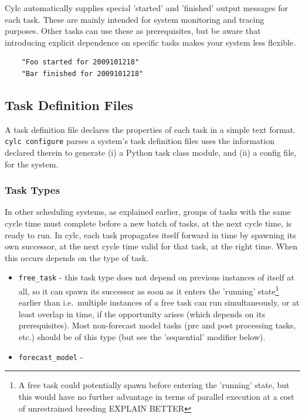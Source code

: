 \documentclass[11pt,a4paper]{article}
\begin{document}
Cylc automatically supplies special 'started' and 'finished' output
messages for each task. These are mainly intended for system monitoring
and tracing purposes. Other tasks can use these as prerequisites, but be
aware that introducing explicit dependence on specific tasks makes your
system less flexible.

\begin{lstlisting}
    "Foo started for 2009101218"
    "Bar finished for 2009101218"
\end{lstlisting}


\pagebreak
\label{sec:taskdef}
\subsection{Task Definition Files}

A task definition file declares the properties of each task in a simple
text format.  \lstinline=cylc configure= parses a system's task definition
files uses the information declared therein to generate (i) a Python
task class module, and (ii) a config file, for the system.

\label{sec:tasktype}
\subsubsection{Task Types}

In other scheduling systems, as explained earlier, groups of tasks with
the same cycle time must complete before a new batch of tasks, at the
next cycle time, is ready to run. In cylc, each task propagates itself
forward in time by spawning its own successor, at the next cycle time 
valid for that task, at the right time. When this occurs depends on the
type of task. 

\begin{itemize}
    \item \lstinline=free_task= - this task type does not depend on
        previous instances of itself at all, so it can spawn its
        successor as soon as it enters the 'running'
        state\footnote{A free task could potentially spawn before
        entering the 'running' state, but this would have no further
        advantage in terms of parallel execution at a cost of
        unrestrained breeding EXPLAIN BETTER} earlier than
        i.e.\ multiple instances of a free task can run simultaneously,
        or at least overlap in time, if the opportunity arises (which
        depends on its prerequisites). Most non-forecast model tasks
        (pre and post processing tasks, etc.) should be of this type
        (but see the 'sequential' modifier below).    

    \item \lstinline=forecast_model= - 
\end{itemize}
\end{document}
